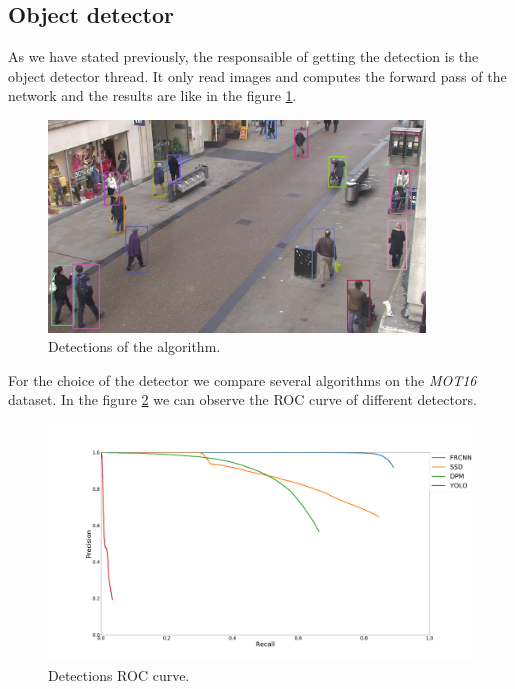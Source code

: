 \documentclass[12pt, a4paper, titlepage,twoside,openright]{article}
\begin{document}
\subsection{Object detector}


As we have stated previously, the responsaible of getting the detection is the object detector thread. It only read images and computes the forward pass of the network and the results are like in the figure \ref{objectDetector1}.

\begin{figure}[H]
\centering         
\includegraphics[width=10cm]{intro/deteccions.jpg}
\caption{Detections of the algorithm.} \label{objectDetector1}
\end{figure}



%

For the choice of the detector we compare several algorithms on the \textit{MOT16} dataset. In the figure \ref{objectDetector2} we can observe the ROC curve of different detectors.


\begin{figure}[h!]
\centering         
\includegraphics[width=15cm]{objectDetection/det.png}
\caption{Detections ROC curve.} \label{objectDetector2}
\end{figure}
\end{document}
